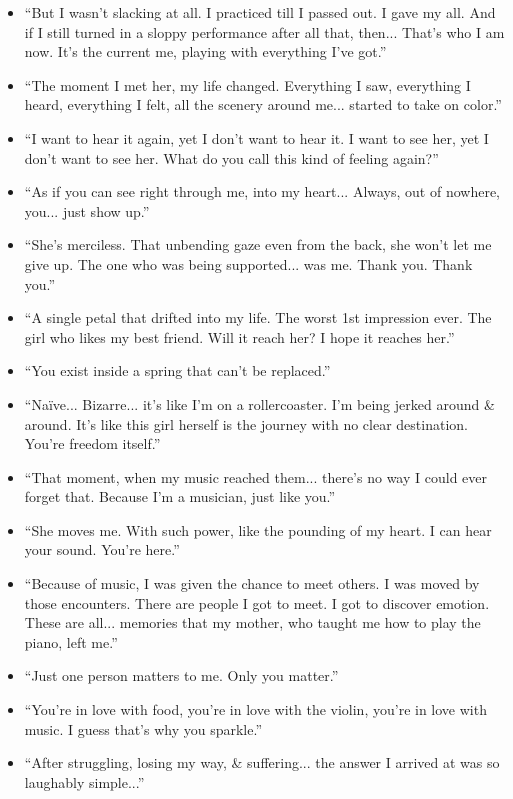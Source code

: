 \documentclass{article}
\begin{document}
\begin{enumerate}
\begin{itemize}
    	\item ``But I wasn't slacking at all. I practiced till I passed out. I gave my all. And if I still turned in a sloppy performance after all that, then... That's who I am now. It's the current me, playing with everything I've got.''
    	\item ``The moment I met her, my life changed. Everything I saw, everything I heard, everything I felt, all the scenery around me... started to take on color.''
    	\item ``I want to hear it again, yet I don't want to hear it. I want to see her, yet I don't want to see her. What do you call this kind of feeling again?''
    	\item ``As if you can see right through me, into my heart... Always, out of nowhere, you... just show up.''
    	\item ``She's merciless. That unbending gaze even from the back, she won't let me give up. The one who was being supported... was me. Thank you. Thank you.''
    	\item ``A single petal that drifted into my life. The worst 1st impression ever. The girl who likes my best friend. Will it reach her? I hope it reaches her.''
    	\item ``You exist inside a spring that can't be replaced.''
    	\item ``Naïve... Bizarre... it's like I'm on a rollercoaster. I'm being jerked around \& around. It's like this girl herself is the journey with no clear destination. You're freedom itself.''
    	\item ``That moment, when my music reached them... there's no way I could ever forget that. Because I'm a musician, just like you.''
    	\item ``She moves me. With such power, like the pounding of my heart. I can hear your sound. You're here.''
    	\item ``Because of music, I was given the chance to meet others. I was moved by those encounters. There are people I got to meet. I got to discover emotion. These are all... memories that my mother, who taught me how to play the piano, left me.''
    	\item ``Just one person matters to me. Only you matter.''
    	\item ``You're in love with food, you're in love with the violin, you're in love with music. I guess that's why you sparkle.''
    	\item ``After struggling, losing my way, \& suffering... the answer I arrived at was so laughably simple...''

\end{itemize}
\end{enumerate}
\end{document}
